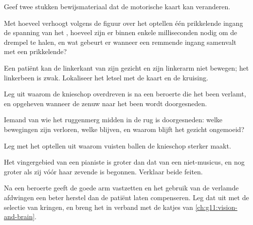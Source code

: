\begin{exercise}[$\star$]\label{exo:g12:brain-and-movement:5}
Geef twee stukken bewijsmateriaal dat de motorische kaart kan veranderen.
\end{exercise}

\begin{exercise}[$\star\star$]\label{exo:g12:brain-and-movement:6}
Met hoeveel verhoogt volgens de figuur over het optellen één prikkelende
ingang de spanning van het , hoeveel zijn er binnen enkele
milliseconden nodig om de drempel te halen, en wat gebeurt er wanneer een
remmende ingang samenvalt met een prikkelende?
\end{exercise}

\begin{exercise}[$\star\star$]\label{exo:g12:brain-and-movement:7}
Een patiënt kan de linkerkant van zijn gezicht en zijn linkerarm niet
bewegen; het linkerbeen is zwak. Lokaliseer het letsel met de kaart en de
kruising.
\end{exercise}

\begin{exercise}[$\star\star$]\label{exo:g12:brain-and-movement:8}
Leg uit waarom de knieschop overdreven is na een beroerte die het been
verlamt, en opgeheven wanneer de zenuw naar het been wordt doorgesneden.
\end{exercise}

\begin{exercise}[$\star\star$]\label{exo:g12:brain-and-movement:9}
Iemand van wie het ruggenmerg midden in de rug is doorgesneden: welke
bewegingen zijn verloren, welke  blijven, en waarom blijft het
gezicht ongemoeid?
\end{exercise}

\begin{exercise}[$\star\star$]\label{exo:g12:brain-and-movement:10}
Leg met het optellen uit waarom vuisten ballen de knieschop sterker maakt.
\end{exercise}

\begin{exercise}[$\star\star$]\label{exo:g12:brain-and-movement:11}
Het vingergebied van een pianiste is groter dan dat van een niet-musicus,
en nog groter als zij vóór haar zevende is begonnen. Verklaar beide
feiten.
\end{exercise}

\begin{exercise}[$\star\star\star$]\label{exo:g12:brain-and-movement:12}
Na een beroerte geeft de goede arm vastzetten en het gebruik van de
verlamde afdwingen een beter herstel dan de patiënt laten compenseren. Leg
dat uit met de selectie van kringen, en breng het in verband met de
katjes van \cref{ch:g11:vision-and-brain}.
\end{exercise}

